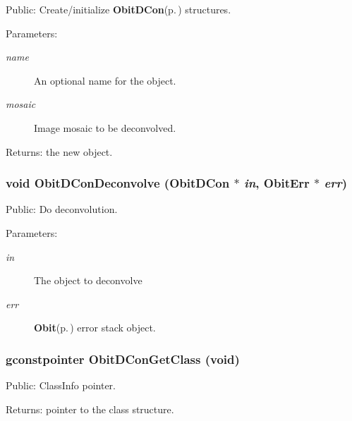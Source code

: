 Public: Create/initialize {\bf Obit\-DCon}{\rm (p.\,\pageref{structObitDCon})} structures. 

\begin{Desc}
\item[Parameters:]
\begin{description}
\item[{\em name}]An optional name for the object. \item[{\em mosaic}]Image mosaic to be deconvolved. \end{description}
\end{Desc}
\begin{Desc}
\item[Returns:]the new object. \end{Desc}
\subsubsection{\setlength{\rightskip}{0pt plus 5cm}void Obit\-DCon\-Deconvolve ({\bf Obit\-DCon} $\ast$ {\em in}, {\bf Obit\-Err} $\ast$ {\em err})}\label{ObitDCon_8h_a12}


Public: Do deconvolution. 

\begin{Desc}
\item[Parameters:]
\begin{description}
\item[{\em in}]The object to deconvolve \item[{\em err}]{\bf Obit}{\rm (p.\,\pageref{structObit})} error stack object. \end{description}
\end{Desc}
\subsubsection{\setlength{\rightskip}{0pt plus 5cm}gconstpointer Obit\-DCon\-Get\-Class (void)}\label{ObitDCon_8h_a8}


Public: Class\-Info pointer. 

\begin{Desc}
\item[Returns:]pointer to the class structure. \end{Desc}
